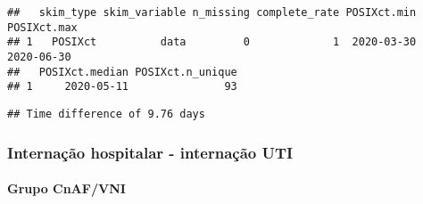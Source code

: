 \documentclass[
]{article}
\newenvironment{Shaded}{\begin{snugshade}}{\end{snugshade}}
\newcommand{\AttributeTok}[1]{\textcolor[rgb]{0.77,0.63,0.00}{#1}}
\newcommand{\FunctionTok}[1]{\textcolor[rgb]{0.00,0.00,0.00}{#1}}
\newcommand{\NormalTok}[1]{#1}
\newcommand{\SpecialCharTok}[1]{\textcolor[rgb]{0.00,0.00,0.00}{#1}}
\newcommand{\StringTok}[1]{\textcolor[rgb]{0.31,0.60,0.02}{#1}}
\begin{document}
\begin{Shaded}
\end{Shaded}

\begin{verbatim}
##   skim_type skim_variable n_missing complete_rate POSIXct.min POSIXct.max
## 1   POSIXct          data         0             1  2020-03-30  2020-06-30
##   POSIXct.median POSIXct.n_unique
## 1     2020-05-11               93
\end{verbatim}

\begin{Shaded}
\end{Shaded}

\begin{verbatim}
## Time difference of 9.76 days
\end{verbatim}

\hypertarget{internauxe7uxe3o-hospitalar---internauxe7uxe3o-uti}{%
\subsubsection{\texorpdfstring{\textbf{Internação hospitalar -
internação
UTI}}{Internação hospitalar - internação UTI}}\label{internauxe7uxe3o-hospitalar---internauxe7uxe3o-uti}}

\hypertarget{grupo-cnafvni-2}{%
\paragraph{\texorpdfstring{\textbf{Grupo
CnAF/VNI}}{Grupo CnAF/VNI}}\label{grupo-cnafvni-2}}

\begin{Shaded}
\end{Shaded}
\end{document}
